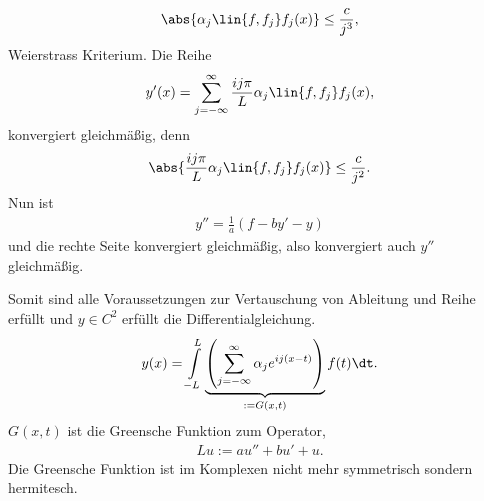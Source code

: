 \begin{bsp}
\begin{align*}
\abs{\alpha_j \lin{f,f_j}f_j(x)} \le \frac{c}{j^3},
\end{align*}
Weierstrass Kriterium. Die Reihe
\begin{align*}
y'(x) = \sum\limits_{j=-\infty}^\infty \frac{ij\pi}{L}\alpha_j \lin{f,f_j}
f_j(x),
\end{align*}
konvergiert gleichmäßig, denn 
\begin{align*}
\abs{\frac{ij\pi}{L}\alpha_j \lin{f,f_j}f_j(x)} \le \frac{c}{j^2}.
\end{align*}
Nun ist
\begin{align*}
y'' = \frac{1}{a}\left(f - by' - y\right)
\end{align*}
und die rechte Seite konvergiert gleichmäßig, also konvergiert auch $y''$
gleichmäßig.

Somit sind alle Voraussetzungen zur Vertauschung von Ableitung und Reihe
erfüllt und $y\in C^2$ erfüllt die Differentialgleichung.
\begin{align*}
y(x) = \int\limits_{-L}^L \underbrace{\left(\sum\limits_{j=-\infty}^\infty
\alpha_j e^{ij(x-t)} \right)}_{:=G(x,t)}f(t)\dt.
\end{align*}
$G(x,t)$ ist die Greensche Funktion zum Operator,
\begin{align*}
Lu := au'' + bu' + u.
\end{align*}
Die Greensche Funktion ist im Komplexen nicht mehr symmetrisch sondern
hermitesch.\bsphere
\end{bsp}

